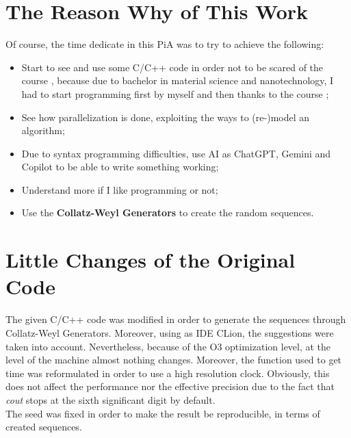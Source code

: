 \documentclass[conference]{IEEEtran}
\begin{document}
	\section{The Reason Why of This Work}
	Of course, the time dedicate in this PiA was to try to achieve the following:
	\begin{itemize}
		\item Start to see and use some C/C++ code in order not to be scared of the course \cite{polimi_data_mining}, because due to bachelor in material science and nanotechnology, I had to start programming first by myself and then thanks to the course \cite{polimi_machine_learning};
		
		\item See how parallelization is done, exploiting the ways to (re-)model an algorithm;
		
		\item Due to syntax programming difficulties, use AI as ChatGPT, Gemini and Copilot to be able to write something working;
		
		\item Understand more if I like programming or not;
		
		\item Use the \textbf{Collatz-Weyl Generators}\cite{działa2024collatzweylgeneratorshighquality} to create the random sequences.
	\end{itemize}
	
	\section{Little Changes of the Original Code}
	The given C/C++ code was modified in order to generate the sequences through Collatz-Weyl Generators. Moreover, using as IDE CLion, the suggestions were taken into account. Nevertheless, because of the O3 optimization level, at the level of the machine almost nothing changes. Moreover, the function used to get time was reformulated in order to use a high resolution clock. Obviously, this does not affect the performance nor the effective precision due to the fact that \textit{cout} stops at the sixth significant digit by default.\\
	The seed was fixed in order to make the result be reproducible, in terms of created sequences.
	
\end{document}

